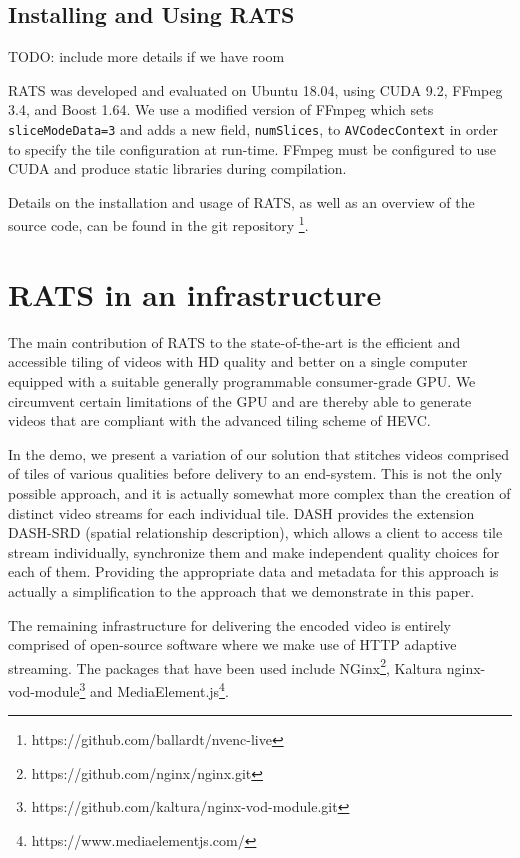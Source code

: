 \subsection{Installing and Using RATS}

TODO: include more details if we have room

RATS was developed and evaluated on Ubuntu 18.04, using CUDA 9.2, FFmpeg 3.4, and Boost 1.64. We use a modified version of FFmpeg which sets \texttt{sliceModeData=3} and adds a new field, \texttt{numSlices}, to \texttt{AVCodecContext} in order to specify the tile configuration at run-time. FFmpeg must be configured to use CUDA and produce static libraries during compilation.

Details on the installation and usage of RATS, as well as an overview of the source code, can be found in the git repository \footnote{https://github.com/ballardt/nvenc-live}.

\section{RATS in an infrastructure} \label{infra}

The main contribution of RATS to the state-of-the-art is the efficient and accessible
tiling of videos with HD quality and better on a single computer equipped with a
suitable generally programmable consumer-grade GPU.
We circumvent certain limitations of the GPU and are thereby able to generate videos
that are compliant with the advanced tiling scheme of HEVC.

In the demo, we present
a variation of our solution that stitches videos comprised of tiles of various
qualities before delivery to an end-system.
This is not the only possible approach, and it is actually somewhat more complex
than the creation of distinct video streams for each individual tile.
DASH provides the extension DASH-SRD (spatial relationship description), which
allows a client to access tile stream individually, synchronize them and make
independent quality choices for each of them. Providing the appropriate data and
metadata for this approach is actually a simplification to the approach that we
demonstrate in this paper.

The remaining infrastructure for delivering the encoded video is entirely comprised
of open-source software where we make use of HTTP adaptive streaming.
The packages that have been used include NGinx\footnote{https://github.com/nginx/nginx.git}, Kaltura nginx-vod-module\footnote{https://github.com/kaltura/nginx-vod-module.git} and MediaElement.js\footnote{https://www.mediaelementjs.com/}.

